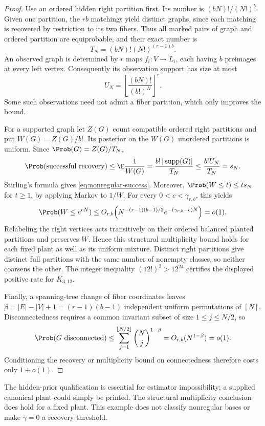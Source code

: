 \begin{proof}
Use an ordered hidden right partition first. Its number is
$(bN)!/(N!)^b$. Given one partition, the $rb$ matchings yield distinct
graphs, since each matching is recovered by restriction to its two
fibers. Thus all marked pairs of graph and ordered partition are
equiprobable, and their exact number is
\[
 T_N=(bN)!(N!)^{(r-1)b}.
\]
An observed graph is determined by $r$ maps $f_i:V\to L_i$, each
having $b$ preimages at every left vertex. Consequently its observation
support has size at most
\[
 U_N=\left[\frac{(bN)!}{(b!)^N}\right]^r.
\]
Some such observations need not admit a fiber partition, which only
improves the bound.

For a supported graph let $Z(G)$ count compatible ordered right
partitions and put $W(G)=Z(G)/b!$. Its posterior on the $W(G)$
unordered partitions is uniform. Since $\Prob(G)=Z(G)/T_N$,
\[
 \Prob(\text{successful recovery})
 \le\E\frac1{W(G)}
 =\frac{b!\,|\operatorname{supp}(G)|}{T_N}
 \le\frac{b!U_N}{T_N}=s_N.
\]
Stirling's formula gives \eqref{eq:nonregular-success}. Moreover,
$\Prob(W\le t)\le t s_N$ for $t\ge1$, by applying Markov to $1/W$.
For every $0<c<\gamma_{r,b}$, this yields
\[
 \Prob(W\le e^{cN})
 \le O_{r,b}\!\left(N^{-(r-1)(b-1)/2}
                         e^{-(\gamma_{r,b}-c)N}\right)=o(1).
\]
Relabeling the right vertices acts transitively on their ordered
balanced planted partitions and preserves $W$. Hence this structural
multiplicity bound holds for each fixed plant as well as its uniform
mixture. Distinct right partitions give distinct full partitions with
the same number of nonempty classes, so neither coarsens the other.
The integer inequality $(12!)^3>12^{24}$ certifies the displayed
positive rate for $K_{3,12}$.

Finally, a spanning-tree change of fiber coordinates leaves
$\beta=|E|-|V|+1=(r-1)(b-1)$ independent uniform permutations of
$[N]$. Disconnectedness requires a common invariant subset of size
$1\le j\le N/2$, so
\[
 \Prob(G\text{ disconnected})
 \le\sum_{j=1}^{\lfloor N/2\rfloor}\binom Nj^{1-\beta}
 =O_{r,b}(N^{1-\beta})=o(1).
\]
Conditioning the recovery or multiplicity bound on connectedness
therefore costs only $1+o(1)$.
\end{proof}

The hidden-prior qualification is essential for estimator impossibility;
a supplied canonical plant could simply be printed. The structural
multiplicity conclusion does hold for a fixed plant. This example does
not classify nonregular bases or make $\gamma=0$ a recovery threshold.

